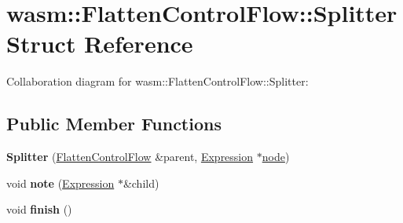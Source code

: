 \hypertarget{structwasm_1_1_flatten_control_flow_1_1_splitter}{}\section{wasm\+:\+:Flatten\+Control\+Flow\+:\+:Splitter Struct Reference}
\label{structwasm_1_1_flatten_control_flow_1_1_splitter}


Collaboration diagram for wasm\+:\+:Flatten\+Control\+Flow\+:\+:Splitter\+:
\subsection*{Public Member Functions}
\begin{DoxyCompactItemize}
\item 
\mbox{\label{structwasm_1_1_flatten_control_flow_1_1_splitter_a2f4411c30c735ec86e867b61493ad991}} 
{\bfseries Splitter} (\mbox{\hyperlink{structwasm_1_1_flatten_control_flow}{Flatten\+Control\+Flow}} \&parent, \mbox{\hyperlink{classwasm_1_1_expression}{Expression}} $\ast$\mbox{\hyperlink{structnode}{node}})
\item 
\mbox{\label{structwasm_1_1_flatten_control_flow_1_1_splitter_a9b1c526bd6d82a60678abfc8bd6d95a8}} 
void {\bfseries note} (\mbox{\hyperlink{classwasm_1_1_expression}{Expression}} $\ast$\&child)
\item 
\mbox{\label{structwasm_1_1_flatten_control_flow_1_1_splitter_a33b24fbb638a940426ff2571b21885cc}} 
void {\bfseries finish} ()
\end{DoxyCompactItemize}
